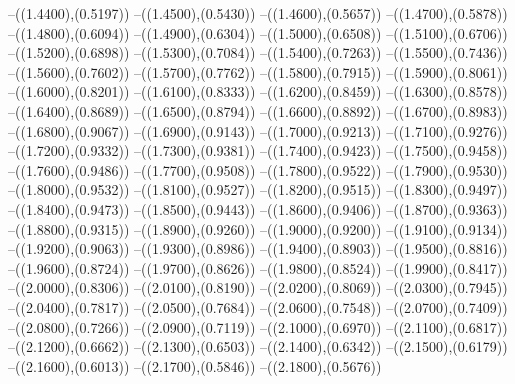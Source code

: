 {	--({\sx*(1.4400)},{\sy*(0.5197)})
	--({\sx*(1.4500)},{\sy*(0.5430)})
	--({\sx*(1.4600)},{\sy*(0.5657)})
	--({\sx*(1.4700)},{\sy*(0.5878)})
	--({\sx*(1.4800)},{\sy*(0.6094)})
	--({\sx*(1.4900)},{\sy*(0.6304)})
	--({\sx*(1.5000)},{\sy*(0.6508)})
	--({\sx*(1.5100)},{\sy*(0.6706)})
	--({\sx*(1.5200)},{\sy*(0.6898)})
	--({\sx*(1.5300)},{\sy*(0.7084)})
	--({\sx*(1.5400)},{\sy*(0.7263)})
	--({\sx*(1.5500)},{\sy*(0.7436)})
	--({\sx*(1.5600)},{\sy*(0.7602)})
	--({\sx*(1.5700)},{\sy*(0.7762)})
	--({\sx*(1.5800)},{\sy*(0.7915)})
	--({\sx*(1.5900)},{\sy*(0.8061)})
	--({\sx*(1.6000)},{\sy*(0.8201)})
	--({\sx*(1.6100)},{\sy*(0.8333)})
	--({\sx*(1.6200)},{\sy*(0.8459)})
	--({\sx*(1.6300)},{\sy*(0.8578)})
	--({\sx*(1.6400)},{\sy*(0.8689)})
	--({\sx*(1.6500)},{\sy*(0.8794)})
	--({\sx*(1.6600)},{\sy*(0.8892)})
	--({\sx*(1.6700)},{\sy*(0.8983)})
	--({\sx*(1.6800)},{\sy*(0.9067)})
	--({\sx*(1.6900)},{\sy*(0.9143)})
	--({\sx*(1.7000)},{\sy*(0.9213)})
	--({\sx*(1.7100)},{\sy*(0.9276)})
	--({\sx*(1.7200)},{\sy*(0.9332)})
	--({\sx*(1.7300)},{\sy*(0.9381)})
	--({\sx*(1.7400)},{\sy*(0.9423)})
	--({\sx*(1.7500)},{\sy*(0.9458)})
	--({\sx*(1.7600)},{\sy*(0.9486)})
	--({\sx*(1.7700)},{\sy*(0.9508)})
	--({\sx*(1.7800)},{\sy*(0.9522)})
	--({\sx*(1.7900)},{\sy*(0.9530)})
	--({\sx*(1.8000)},{\sy*(0.9532)})
	--({\sx*(1.8100)},{\sy*(0.9527)})
	--({\sx*(1.8200)},{\sy*(0.9515)})
	--({\sx*(1.8300)},{\sy*(0.9497)})
	--({\sx*(1.8400)},{\sy*(0.9473)})
	--({\sx*(1.8500)},{\sy*(0.9443)})
	--({\sx*(1.8600)},{\sy*(0.9406)})
	--({\sx*(1.8700)},{\sy*(0.9363)})
	--({\sx*(1.8800)},{\sy*(0.9315)})
	--({\sx*(1.8900)},{\sy*(0.9260)})
	--({\sx*(1.9000)},{\sy*(0.9200)})
	--({\sx*(1.9100)},{\sy*(0.9134)})
	--({\sx*(1.9200)},{\sy*(0.9063)})
	--({\sx*(1.9300)},{\sy*(0.8986)})
	--({\sx*(1.9400)},{\sy*(0.8903)})
	--({\sx*(1.9500)},{\sy*(0.8816)})
	--({\sx*(1.9600)},{\sy*(0.8724)})
	--({\sx*(1.9700)},{\sy*(0.8626)})
	--({\sx*(1.9800)},{\sy*(0.8524)})
	--({\sx*(1.9900)},{\sy*(0.8417)})
	--({\sx*(2.0000)},{\sy*(0.8306)})
	--({\sx*(2.0100)},{\sy*(0.8190)})
	--({\sx*(2.0200)},{\sy*(0.8069)})
	--({\sx*(2.0300)},{\sy*(0.7945)})
	--({\sx*(2.0400)},{\sy*(0.7817)})
	--({\sx*(2.0500)},{\sy*(0.7684)})
	--({\sx*(2.0600)},{\sy*(0.7548)})
	--({\sx*(2.0700)},{\sy*(0.7409)})
	--({\sx*(2.0800)},{\sy*(0.7266)})
	--({\sx*(2.0900)},{\sy*(0.7119)})
	--({\sx*(2.1000)},{\sy*(0.6970)})
	--({\sx*(2.1100)},{\sy*(0.6817)})
	--({\sx*(2.1200)},{\sy*(0.6662)})
	--({\sx*(2.1300)},{\sy*(0.6503)})
	--({\sx*(2.1400)},{\sy*(0.6342)})
	--({\sx*(2.1500)},{\sy*(0.6179)})
	--({\sx*(2.1600)},{\sy*(0.6013)})
	--({\sx*(2.1700)},{\sy*(0.5846)})
	--({\sx*(2.1800)},{\sy*(0.5676)})
}
